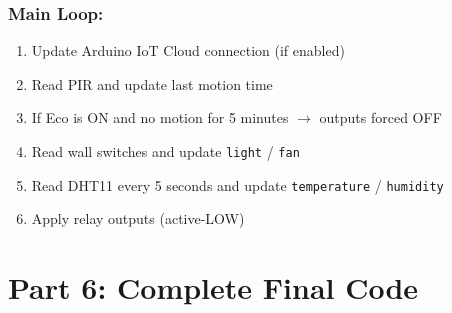 \documentclass[12pt,a4paper]{article}
\begin{document}
\subsubsection{Main Loop:}
\begin{enumerate}
\item Update Arduino IoT Cloud connection (if enabled)
\item Read PIR and update last motion time
\item If Eco is ON and no motion for 5 minutes $\rightarrow$ outputs forced OFF
\item Read wall switches and update \texttt{light} / \texttt{fan}
\item Read DHT11 every 5 seconds and update \texttt{temperature} / \texttt{humidity}
\item Apply relay outputs (active-LOW)
\end{enumerate}

\newpage
\section{Part 6: Complete Final Code}
\end{document}
